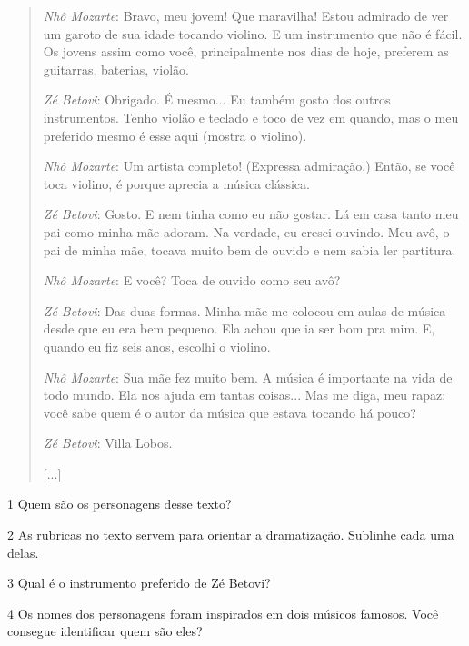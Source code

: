 \begin{quote}
\emph{Nhô Mozarte}: Bravo, meu jovem! Que maravilha! Estou admirado de
ver um garoto de sua idade tocando violino. E um instrumento que não é
fácil. Os jovens assim como você, principalmente nos dias de hoje,
preferem as guitarras, baterias, violão.

\emph{Zé Betovi}: Obrigado. É mesmo... Eu também gosto dos outros
instrumentos. Tenho violão e teclado e toco de vez em quando, mas o meu
preferido mesmo é esse aqui (mostra o violino).

\emph{Nhô Mozarte}: Um artista completo! (Expressa admiração.) Então, se
você toca violino, é porque aprecia a música clássica.

\emph{Zé Betovi}: Gosto. E nem tinha como eu não gostar. Lá em casa
tanto meu pai como minha mãe adoram. Na verdade, eu cresci ouvindo. Meu
avô, o pai de minha mãe, tocava muito bem de ouvido e nem sabia ler
partitura.

\emph{Nhô Mozarte}: E você? Toca de ouvido como seu avô?

\emph{Zé Betovi}: Das duas formas. Minha mãe me colocou em aulas de
música desde que eu era bem pequeno. Ela achou que ia ser bom pra mim.
E, quando eu fiz seis anos, escolhi o violino.

\emph{Nhô Mozarte}: Sua mãe fez muito bem. A música é importante na vida
de todo mundo. Ela nos ajuda em tantas coisas... Mas me diga, meu rapaz:
você sabe quem é o autor da música que estava tocando há pouco?

\emph{Zé Betovi}: Villa Lobos.

{[}...{]}

\end{quote}

\pagebreak
\num{1} Quem são os personagens desse texto? 


\num{2} As rubricas no texto servem para orientar a dramatização. Sublinhe cada uma delas.
\bigskip

\num{3} Qual é o instrumento preferido de Zé Betovi? 


\num{4} Os nomes dos personagens foram inspirados em dois músicos famosos. Você
consegue identificar quem são eles? 

